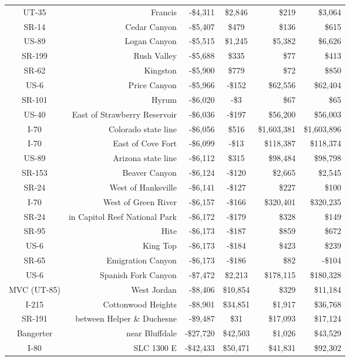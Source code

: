 \documentclass[]{ascelike-new}
\begin{document}
\begin{table}
{{\begin{tabular}[t]{crrcrr}
UT-35 & Francis & -\$4,311 & \$2,846 & \$219 & \$3,064\\
SR-14 & Cedar Canyon & -\$5,407 & \$479 & \$136 & \$615\\
US-89 & Logan Canyon & -\$5,515 & \$1,245 & \$5,382 & \$6,626\\
\addlinespace
SR-199 & Rush Valley & -\$5,688 & \$335 & \$77 & \$413\\
SR-62 & Kingston & -\$5,900 & \$779 & \$72 & \$850\\
US-6 & Price Canyon & -\$5,966 & -\$152 & \$62,556 & \$62,404\\
SR-101 & Hyrum & -\$6,020 & -\$3 & \$67 & \$65\\
US-40 & East of Strawberry Reservoir & -\$6,036 & -\$197 & \$56,200 & \$56,003\\
\addlinespace
I-70 & Colorado state line & -\$6,056 & \$516 & \$1,603,381 & \$1,603,896\\
I-70 & East of Cove Fort & -\$6,099 & -\$13 & \$118,387 & \$118,374\\
US-89 & Arizona state line & -\$6,112 & \$315 & \$98,484 & \$98,798\\
SR-153 & Beaver Canyon & -\$6,124 & -\$120 & \$2,665 & \$2,545\\
SR-24 & West of Hanksville & -\$6,141 & -\$127 & \$227 & \$100\\
\addlinespace
I-70 & West of Green River & -\$6,157 & -\$166 & \$320,401 & \$320,235\\
SR-24 & in Capitol Reef National Park & -\$6,172 & -\$179 & \$328 & \$149\\
SR-95 & Hite & -\$6,173 & -\$187 & \$859 & \$672\\
US-6 & King Top & -\$6,173 & -\$184 & \$423 & \$239\\
SR-65 & Emigration Canyon & -\$6,173 & -\$186 & \$82 & -\$104\\
\addlinespace
US-6 & Spanish Fork Canyon & -\$7,472 & \$2,213 & \$178,115 & \$180,328\\
MVC (UT-85) & West Jordan & -\$8,406 & \$10,854 & \$329 & \$11,184\\
I-215 & Cottonwood Heights & -\$8,901 & \$34,851 & \$1,917 & \$36,768\\
SR-191 & between Helper \& Duchesne & -\$9,487 & \$31 & \$17,093 & \$17,124\\
Bangerter & near Bluffdale & -\$27,720 & \$42,503 & \$1,026 & \$43,529\\
\addlinespace
I-80 & SLC 1300 E & -\$42,433 & \$50,471 & \$41,831 & \$92,302\\
\bottomrule
\end{tabular}}

}

\end{table}%
\end{document}
